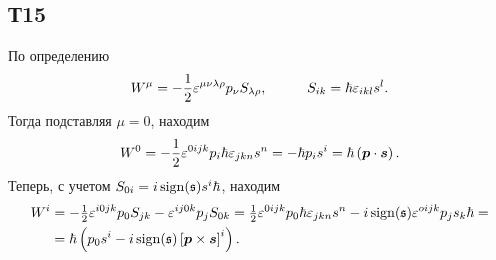 \subsection*{Т15}

По определению
\begin{equation*}
	W^\mu = - \frac{1}{2} \varepsilon^{\mu \nu \lambda \rho} p_\nu S_{\lambda \rho},
	\hspace{10 mm} 
	S_{ik} = \hbar \varepsilon_{ikl} s^l.
\end{equation*}
Тогда подставляя $\mu = 0$, находим
\begin{equation*}
	W^0 = - \frac{1}{2} \varepsilon^{0 i j k} p_i \hbar \varepsilon_{jkn} s^n = - \hbar p_i s^i = \hbar \left(\mbox{\boldmath $p$} \cdot \mbox{\boldmath $s$}\right).
\end{equation*}
Теперь, с учетом $S_{0i} = i \mathop{\mathrm{sign}}\nolimits(\mathfrak{s}) s^i \hbar$, находим
\begin{align*}
	W^i &= - \tfrac{1}{2}\varepsilon^{i0jk} p_0 S_{jk} - \varepsilon^{i j 0 k} p_j S_{0k} = \tfrac{1}{2} \varepsilon^{0 ijk} p_0 \hbar \varepsilon_{jkn} s^n - i \mathop{\mathrm{sign}}\nolimits(\mathfrak{s}) \varepsilon^{o i jk} p_j s_k \hbar = \\ &= \hbar \left(
		p_0 s^i - i \mathop{\mathrm{sign}}\nolimits(\mathfrak s)  \left[\mbox{\boldmath $p$} \times  \mbox{\boldmath $s$}\right]^i
	\right).
\end{align*}
